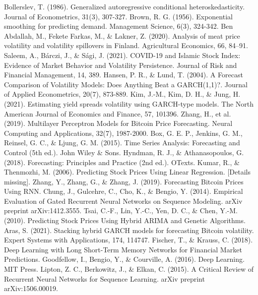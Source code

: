 \documentclass{ieeeojies}
\begin{document}
\begin{thebibliography}{00}
   Bollerslev, T. (1986). Generalized autoregressive conditional heteroskedasticity. Journal of Econometrics, 31(3), 307-327.
   Brown, R. G. (1956). Exponential smoothing for predicting demand. Management Science, 6(3), 324-342.
   Ben Abdallah, M., Fekete Farkas, M., \& Lakner, Z. (2020). Analysis of meat price volatility and volatility spillovers in Finland. Agricultural Economics, 66, 84–91.
   Saleem, A., Bárczi, J., \& Sági, J. (2021). COVID-19 and Islamic Stock Index: Evidence of Market Behavior and Volatility Persistence. Journal of Risk and Financial Management, 14, 389.
   Hansen, P. R., \& Lund, T. (2004). A Forecast Comparison of Volatility Models: Does Anything Beat a GARCH(1,1)?. Journal of Applied Econometrics, 20(7), 873-889.
   Kim, J.-M., Kim, D. H., \& Jung, H. (2021). Estimating yield spreads volatility using GARCH-type models. The North American Journal of Economics and Finance, 57, 101396.
   Zhang, H., et al. (2019). Multilayer Perceptron Models for Bitcoin Price Forecasting. Neural Computing and Applications, 32(7), 1987-2000.
   Box, G. E. P., Jenkins, G. M., Reinsel, G. C., \& Ljung, G. M. (2015). Time Series Analysis: Forecasting and Control (5th ed.). John Wiley \& Sons.
   Hyndman, R. J., \& Athanasopoulos, G. (2018). Forecasting: Principles and Practice (2nd ed.). OTexts.
   Kumar, R., \& Thenmozhi, M. (2006). Predicting Stock Prices Using Linear Regression. [Details missing].
   Zhang, Y., Zhang, G., \& Zhang, J. (2019). Forecasting Bitcoin Prices Using RNN.
   Chung, J., Gulcehre, C., Cho, K., \& Bengio, Y. (2014). Empirical Evaluation of Gated Recurrent Neural Networks on Sequence Modeling. arXiv preprint arXiv:1412.3555.
   Tsai, C.-F., Lin, Y.-C., Yen, D. C., \& Chen, Y.-M. (2010). Predicting Stock Prices Using Hybrid ARIMA and Genetic Algorithms.
   Aras, S. (2021). Stacking hybrid GARCH models for forecasting Bitcoin volatility. Expert Systems with Applications, 174, 114747.
   Fischer, T., \& Krauss, C. (2018). Deep Learning with Long Short-Term Memory Networks for Financial Market Predictions.
   Goodfellow, I., Bengio, Y., \& Courville, A. (2016). Deep Learning. MIT Press.
   Lipton, Z. C., Berkowitz, J., \& Elkan, C. (2015). A Critical Review of Recurrent Neural Networks for Sequence Learning. arXiv preprint arXiv:1506.00019.

\end{thebibliography}
\end{document}
